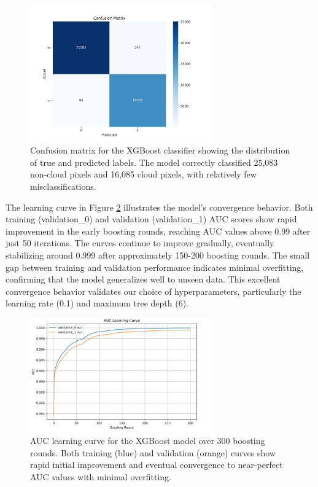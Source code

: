 \documentclass[10pt,letterpaper]{article}
\begin{document}
\begin{figure}[h]
\centering
\includegraphics[width=0.7\textwidth]{xgboost_confusion_matrix_raw_autoencoder_extra engineered.png}
\caption{Confusion matrix for the XGBoost classifier showing the distribution of true and predicted labels. The model correctly classified 25,083 non-cloud pixels and 16,085 cloud pixels, with relatively few misclassifications.}
\label{fig:confusion_matrix}
\end{figure}

The learning curve in Figure \ref{fig:learning_curve} illustrates the model's convergence behavior. Both training (validation\_0) and validation (validation\_1) AUC scores show rapid improvement in the early boosting rounds, reaching AUC values above 0.99 after just 50 iterations. The curves continue to improve gradually, eventually stabilizing around 0.999 after approximately 150-200 boosting rounds. The small gap between training and validation performance indicates minimal overfitting, confirming that the model generalizes well to unseen data. This excellent convergence behavior validates our choice of hyperparameters, particularly the learning rate (0.1) and maximum tree depth (6).

\begin{figure}[h]
\centering
\includegraphics[width=0.7\textwidth]{learning_curve.png}
\caption{AUC learning curve for the XGBoost model over 300 boosting rounds. Both training (blue) and validation (orange) curves show rapid initial improvement and eventual convergence to near-perfect AUC values with minimal overfitting.}
\label{fig:learning_curve}
\end{figure}
\end{document}
